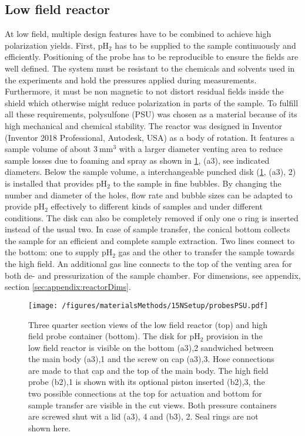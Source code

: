         \subsection{Low field reactor}
        \label{sec:matMeth:lowFieldReactor}
        At low field, multiple design features have to be combined to achieve high polarization yields.  First, pH$_2$ has to be supplied to the sample continuously and efficiently. Positioning of the probe has to be reproducible to ensure the fields are well defined.  The system must be resistant to the chemicals and solvents used in the experiments and hold the pressures applied during measurements.  Furthermore, it must be non magnetic to not distort residual fields inside the shield which otherwise might reduce polarization in parts of the sample. To fulfill all these requirements, polysulfone (PSU) was chosen as a material because of its high mechanical and chemical stability.  The reactor was designed in Inventor (Inventor 2018 Professional, Autodesk, USA) as a body of rotation. It features a sample volume of about $\SI{3}{\mm\cubed}$ with a larger diameter venting area to reduce sample losses due to foaming and spray as shown in \ref{figure:materialsMethods:probesPSU}, (a3), see indicated diameters. Below the sample volume, a interchangeable punched disk (\ref{figure:materialsMethods:probesPSU}, (a3), 2) is installed that provides pH$_2$ to the sample in fine bubbles. By changing the number and diameter of the holes, flow rate and bubble sizes can be adapted to provide pH$_2$ effectively to different kinds of samples and under different conditions. The disk can also be completely removed if only one o ring is inserted instead of the usual two. In case of sample transfer, the conical bottom collects the sample for an efficient and complete sample extraction.  Two lines connect to the bottom: one to supply pH$_2$ gas and the other to transfer the sample towards the high field.  An additional gas line connects to the top of the venting area for both de- and pressurization of the sample chamber.
        For dimensions, see appendix, section \ref{sec:appendix:reactorDims}.
            \begin{figure}
                \centering
                \texttt{[image: /figures/materialsMethods/15NSetup/probesPSU.pdf]}
                \caption[Reactor gemometry]{Three quarter section views of the low field reactor (top) and high field probe container (bottom). The disk for pH$_2$ provision in the low field reactor is visible on the bottom (a3),2 sandwiched between the main body (a3),1 and the screw on cap (a3),3.  Hose connections are made to that cap and the top of the main body. The high field probe (b2),1 is shown with its optional piston inserted (b2),3, the two possible connections at the top for actuation and bottom for sample transfer are visible in the cut views. Both pressure containers are screwed shut wit a lid (a3), 4 and (b3), 2. Seal rings are not shown here.}
                \label{figure:materialsMethods:probesPSU}
            \end{figure}
